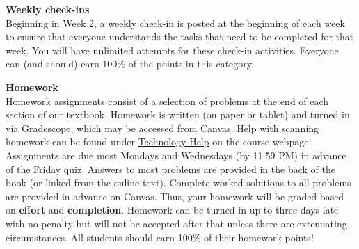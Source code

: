 \documentclass[12pt]{article}
\renewcommand{\emph}[1]{\textsf{\textbf{#1}}}
\newcommand{\localhead}[1]{\par\smallskip\textbf{#1}\nobreak\\}%
\def\heading#1{\localhead{\large\emph{#1}}}
\newenvironment{clist}%
{\bgroup\parskip 0pt\begin{list}{$\bullet$}{\partopsep 4pt\topsep 0pt\itemsep -2pt}}%
{\end{list}\egroup}%
\begin{document}
%

\heading{Weekly check-ins}
Beginning in Week 2, a weekly check-in is posted at the beginning of each week to ensure that everyone understands the tasks that need to be completed for that week. You will have unlimited attempts for these check-in activities. Everyone can (and should) earn 100\% of the points in this category.

\heading{Homework}
Homework assignments consist of a selection of problems at the end of each section of our textbook. Homework is written (on paper or tablet) and turned in via Gradescope, which may be accessed from Canvas.  Help with scanning homework can be found under \href{https://uaf-math251.github.io/techHelp.html}{Technology Help} on the course webpage. Assignments are due most Mondays and Wednesdays (by 11:59 PM) in advance of the Friday quiz.  Answers to most problems are provided in the back of the book (or linked from the online text). Complete worked solutions to all problems are provided in advance on Canvas. Thus, your homework will be graded based on \emph{effort} and \emph{completion}. Homework can be turned in up to three days late with no penalty but will not be accepted after that unless there are extenuating circumstances. All students should earn 100\% of their homework points!
\end{document}

